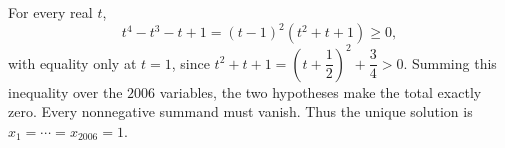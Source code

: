 For every real $t$,
\[
t^4-t^3-t+1=(t-1)^2(t^2+t+1)\ge0,
\]
with equality only at $t=1$, since $t^2+t+1=(t+\dfrac{1}{2})^2+\dfrac{3}{4}>0$. Summing this inequality over the $2006$ variables, the two hypotheses make the total exactly zero. Every nonnegative summand must vanish. Thus the unique solution is $\boxed{x_1=\cdots=x_{2006}=1}$.
